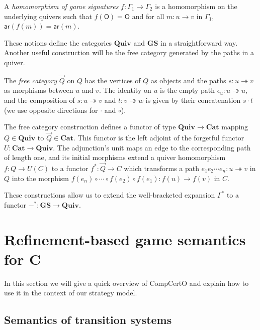 \documentclass[format=sigplan,authordraft]{acmart}
\newcommand{\kw}[1]{\ensuremath{ \mathsf{#1} }}
\begin{document}
\begin{definition}
A \emph{homomorphism of game signatures} $f : \Gamma_1 \rightarrow \Gamma_2$
is a homomorphism on the underlying quivers
such that $f(\kw{O}) = \kw{O}$ and for all
$m : u \rightarrow v$ in $\Gamma_1$,
$\kw{ar}(f(m)) = \kw{ar}(m)$.
\end{definition}

These notions define the categories
$\mathbf{Quiv}$ and $\mathbf{GS}$
in a straightforward way.
Another useful construction will be the
free category generated by the paths in a quiver.

\begin{definition}
The \emph{free category} $\vec{Q}$ on $Q$
has the vertices of $Q$ as objects and
the paths $s : u \twoheadrightarrow v$
as morphisms between $u$ and $v$.
The identity on $u$ is the empty path
$\epsilon_u : u \twoheadrightarrow u$,
and the composition of $s : u \twoheadrightarrow v$ and
$t : v \twoheadrightarrow w$
is given by their concatenation $s \cdot t$
(we use opposite directions for $\cdot$ and $\circ$).
\end{definition}

The free category construction defines a functor
of type $\mathbf{Quiv} \rightarrow \mathbf{Cat}$
mapping $Q \in \mathbf{Quiv}$ to $\vec{Q} \in \mathbf{Cat}$.
This functor is the left adjoint of
the forgetful functor $U : \mathbf{Cat} \rightarrow \mathbf{Quiv}$.
The adjunction's unit maps an edge to
the corresponding path of length one,
and its initial morphisms extend a quiver homomorphism
$f : Q \rightarrow U(C)$
to a functor $f^* : \vec{Q} \rightarrow C$
which transforms a path
$e_1 e_2 \cdots e_n : u \twoheadrightarrow v$ in $Q$
into the morphism
$f(e_n) \circ \cdots \circ f(e_2) \circ f(e_1) : f(u) \rightarrow f(v)$ in $C$.

These constructions allow us to extend
the well-bracketed expansion $\Gamma^*$ to a functor
$-^* : \mathbf{GS} \rightarrow \mathbf{Quiv}$.




\section{Refinement-based game semantics for C} %

In this section we will give a quick overview of CompCertO
and explain how to use it in the context of our strategy model.

\subsection{Semantics of transition systems} %
\end{document}
